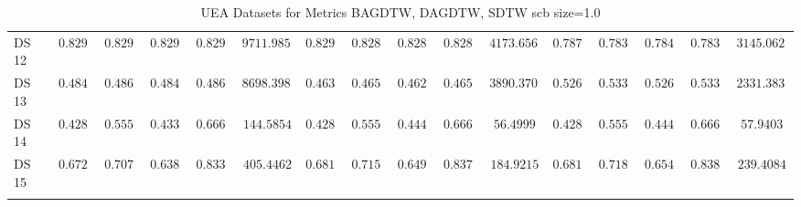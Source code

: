{\begin{longtable}{|l|ccccc|ccccc|ccccc|}
		DS 12 & $0.8298$ & $0.8291$ & $0.8294$ & $0.8291$ & $9711.9857$ & $0.8298$ & $0.8281$ & $0.8287$ & $0.8281$ & $4173.6560$ & $0.7872$ & $0.7839$ & $0.7841$ & $0.7839$ & $3145.0622$ \\
		DS 13 & $0.4842$ & $0.4866$ & $0.4840$ & $0.4866$ & $8698.3988$ & $0.4632$ & $0.4653$ & $0.4629$ & $0.4653$ & $3890.3708$ & $0.5263$ & $\boldsymbol{0.5331}$ & $\boldsymbol{0.5261}$ & $\boldsymbol{0.5331}$ & $2331.3833$ \\
		DS 14 & $0.4286$ & $0.5556$ & $0.4333$ & $0.6667$ & $144.5854$ & $0.4286$ & $0.5556$ & $0.4444$ & $0.6667$ & $56.4999$ & $0.4286$ & $0.5556$ & $0.4444$ & $0.6667$ & $57.9403$ \\
		DS 15 & $0.6727$ & $0.7077$ & $0.6381$ & $0.8330$ & $405.4462$ & $0.6818$ & $0.7156$ & $0.6498$ & $0.8375$ & $184.9215$ & $\boldsymbol{0.6818}$ & $\boldsymbol{0.7181}$ & $\boldsymbol{0.6548}$ & $\boldsymbol{0.8389}$ & $239.4084$ \\
		\hline
		\caption{UEA Datasets for Metrics BAGDTW, DAGDTW, SDTW \gls{scb} size=1.0}
		\label{tab:UEA_bagdtw-dagdtw-sdtw_scb_size=1.0}
	\end{longtable}
}
